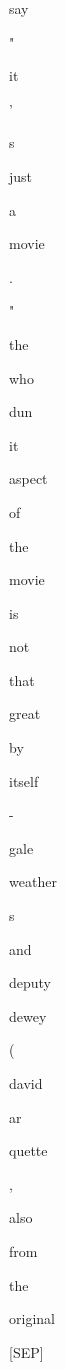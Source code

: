 \documentclass[varwidth=150mm]{standalone}
\begin{document}
\begin{CJK*}{UTF8}{gbsn}
{{{\colorbox{red!0.0}{\strut say} \colorbox{red!3.504268169403076}{\strut "} \colorbox{red!7.301674842834473}{\strut it} \colorbox{red!2.303934097290039}{\strut '} \colorbox{red!3.509830951690674}{\strut s} \colorbox{red!6.591762542724609}{\strut just} \colorbox{red!0.0}{\strut a} \colorbox{red!6.6275224685668945}{\strut movie} \colorbox{red!0.0}{\strut .} \colorbox{red!3.830892562866211}{\strut "} \colorbox{red!12.254217147827148}{\strut the} \colorbox{red!3.3396356105804443}{\strut who}\colorbox{red!16.2635440826416}{\strut dun}\colorbox{red!11.390206336975098}{\strut it} \colorbox{red!5.796790599822998}{\strut aspect} \colorbox{red!5.870633125305176}{\strut of} \colorbox{red!10.963492393493652}{\strut the} \colorbox{red!8.671029090881348}{\strut movie} \colorbox{red!27.717924118041992}{\strut is} \colorbox{red!34.24205780029297}{\strut not} \colorbox{red!3.7199666500091553}{\strut that} \colorbox{red!3.5580029487609863}{\strut great} \colorbox{red!1.2874736785888672}{\strut by} \colorbox{red!5.732269287109375}{\strut itself} \colorbox{red!9.356224060058594}{\strut -} \colorbox{red!17.903505325317383}{\strut gale} \colorbox{red!4.79964017868042}{\strut weather}\colorbox{red!2.369079828262329}{\strut s} \colorbox{red!6.895049571990967}{\strut and} \colorbox{red!67.59636688232422}{\strut deputy} \colorbox{red!100.0}{\strut dewey} \colorbox{red!18.637317657470703}{\strut (} \colorbox{red!1.7286862134933472}{\strut david} \colorbox{red!2.718303680419922}{\strut ar}\colorbox{red!15.533879280090332}{\strut quette} \colorbox{red!7.824974536895752}{\strut ,} \colorbox{red!2.6197714805603027}{\strut also} \colorbox{red!7.468971252441406}{\strut from} \colorbox{red!3.1686887741088867}{\strut the} \colorbox{red!8.711018562316895}{\strut original} \colorbox{red!1.715645670890808}{\strut [SEP]}
}}}
\end{CJK*}
\end{document}
